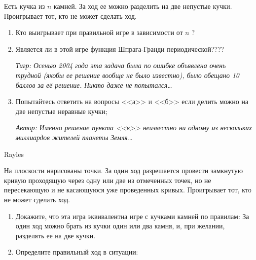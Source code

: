 \begin{problem}
Есть кучка из  $n$  камней. За ход ее можно разделить на две непустые кучки. Проигрывает тот, кто не может сделать ход. \par
\begin{enumerate}
\item 	Кто выигрывает при правильной игре в зависимости от  $n$ ?\par
\item 	Является ли в этой игре функция Шпрага-Гранди периодической????\par
{\it Тигр: Осенью 2004 года эта задача была по ошибке объявлена очень трудной (якобы ее решение вообще не было известно), было обещано 10 баллов за её решение. Никто даже не попытался\ldots }\par
\item 	Попытайтесь ответить на вопросы <<а>> и <<б>> если делить можно на две непустые неравные кучки;\par
{\it Автор: Именно решение пункта <<в>> неизвестно ни одному из нескольких миллиардов жителей планеты Земля\ldots }\par
\end{enumerate}


\begin{sol}

\end{sol}
\end{problem}





\begin{problem}
\begin{source} Rayles\end{source}
 \label{Rayles}
На плоскости нарисованы точки. За один ход разрешается провести замкнутую кривую проходящую через одну или две из отмеченных точек, но не пересекающую и не касающуюся уже проведенных кривых. Проигрывает тот, кто не может сделать ход.\par
\begin{enumerate}
\item 	Докажите, что эта игра эквивалентна игре с кучками камней по правилам: За один ход можно брать из кучки один или два камня, и, при желании, разделять ее на две кучки.\par
\item 	Определите правильный ход в ситуации:\par
\end{enumerate}


\begin{sol}

\end{sol}
\end{problem}

